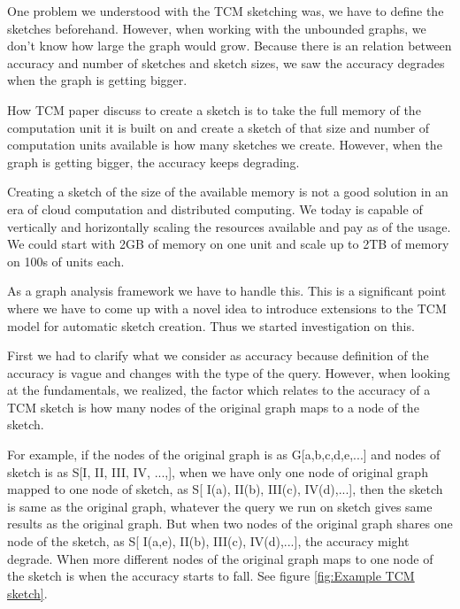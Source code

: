 \documentclass[conference]{IEEEtran}
\begin{document}
One problem we understood with the TCM sketching was, we have to define the sketches beforehand. However, when working with the unbounded graphs, we don’t know how large the graph would grow. Because there is an relation between accuracy and number of sketches and sketch sizes, we saw the accuracy degrades when the graph is getting bigger. 


How TCM paper discuss to create a sketch is to take the full memory of the computation unit it is built on and create a sketch of that size and number of computation units available is how many sketches we create. However, when the graph is getting bigger, the accuracy keeps degrading. 


Creating a sketch of the size of the available memory is not a good solution in an era of cloud computation and distributed computing. We today is capable of vertically and horizontally scaling the resources available and pay as of the usage. We could start with 2GB of memory on one unit and scale up to 2TB of memory on 100s of units each.


As a graph analysis framework we have to handle this. This is a significant point where we have to come up with a novel idea to introduce extensions to the TCM model for automatic sketch creation. Thus we started investigation on this.

First we had to clarify what we consider as accuracy because definition of the accuracy is vague and changes with the type of the query. However, when looking at the fundamentals, we realized, the factor which relates to the accuracy of a TCM sketch is how many nodes of the original graph maps to a node of the sketch.


 For example, if the nodes of the original graph is as G[a,b,c,d,e,...] and nodes of sketch is as S[I, II, III, IV, ...,], when  we have only one node of original graph mapped to one node of sketch, as S[ I(a), II(b), III(c), IV(d),...], then the sketch is same as the original graph, whatever the query we run on sketch gives same results as the original graph. But when two nodes of the original graph shares one node of the sketch, as S[ I(a,e), II(b), III(c), IV(d),...], the accuracy might degrade. When more different nodes of the original graph maps to one node of the sketch is when the accuracy starts to fall. See figure \ref{fig:Example TCM sketch}.
 
\end{document}
